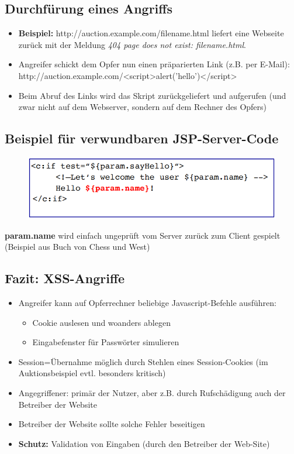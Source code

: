 \documentclass[openany]{book}
\begin{document}
\subsection{Durchfürung eines Angriffs}

\begin{itemize}
    \item \textbf{Beispiel:} http://auction.example.com/filename.html liefert eine Webseite zurück mit der Meldung \textit{404 page does not exist: filename.html}.
    \item Angreifer schickt dem Opfer nun einen präparierten Link (z.B. per E-Mail): http://auction.example.com/<script>alert('hello')</script>
    \item Beim Abruf des Links wird das Skript zurückgeliefert und aufgerufen (und zwar nicht auf dem Webserver, sondern auf dem Rechner des Opfers)
\end{itemize}

\subsection{Beispiel für verwundbaren JSP-Server-Code}

\begin{figure}[h!]
    \centering
    \includegraphics[width=0.85\linewidth]{Pics/XSS.PNG}
\end{figure}

\textbf{param.name} wird einfach ungeprüft vom Server zurück zum Client gespielt (Beispiel aus Buch von Chess und West)

\subsection{Fazit: XSS-Angriffe}

\begin{itemize}
    \item Angreifer kann auf Opferrechner beliebige Javascript-Befehle ausführen:
    \begin{itemize}
        \item Cookie auslesen und woanders ablegen
        \item Eingabefenster für Passwörter simulieren
    \end{itemize}
    \item Session=Übernahme möglich durch Stehlen eines Session-Cookies (im Auktionsbeispiel evtl. besonders kritisch)
    \item Angegriffener: primär der Nutzer, aber z.B. durch Rufschädigung auch der Betreiber der Website
    \item Betreiber der Website sollte solche Fehler beseitigen
    \item \textbf{Schutz:} Validation von Eingaben (durch den Betreiber der Web-Site) 
\end{itemize}
\end{document}
